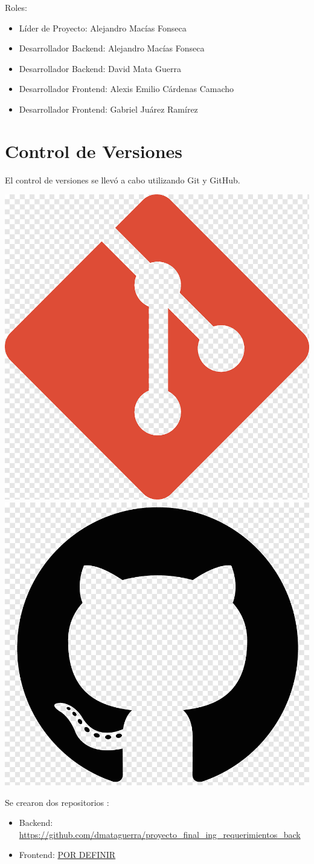 	Roles: 
	\begin{itemize}
		\item Líder de Proyecto: Alejandro Macías Fonseca
		\item Desarrollador Backend: Alejandro Macías Fonseca
		\item Desarrollador Backend: David Mata Guerra
		\item Desarrollador Frontend: Alexis Emilio Cárdenas Camacho
		\item Desarrollador Frontend: Gabriel Juárez Ramírez
	\end{itemize}
	
	\section{Control de Versiones}
	El control de versiones se llevó a cabo utilizando Git y GitHub. 
		\begin{center}
		\includegraphics[width=0.3\linewidth]{./images/gitlogo.png}
		\includegraphics[width=0.3\linewidth]{./images/github_logo.png}
	\end{center}


	Se crearon dos repositorios :
	\begin{itemize}
		\item 	Backend: \url{https://github.com/dmataguerra/proyecto_final_ing_requerimientos_back}
		\item   Frontend: \url{POR DEFINIR}	
	\end{itemize}


